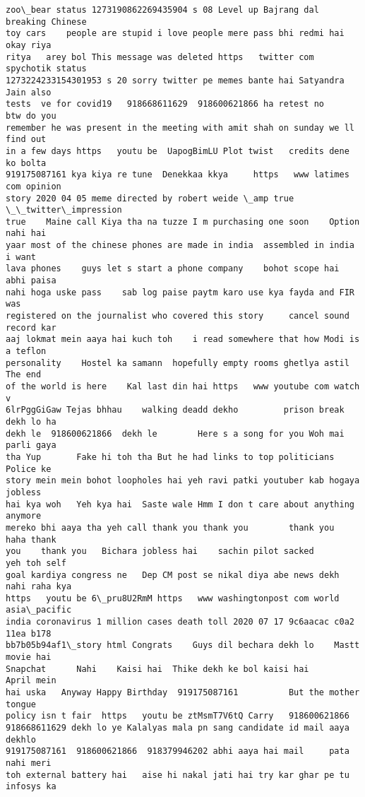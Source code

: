 \documentclass[11pt]{article}
\begin{document}
\begin{tcolorbox}[breakable, size=fbox, boxrule=.5pt, pad at break*=1mm, opacityfill=0]
\begin{Verbatim}[commandchars=\\\{\}]
zoo\_bear status 1273190862269435904 s 08 Level up Bajrang dal breaking Chinese
toy cars    people are stupid i love people mere pass bhi redmi hai okay riya
ritya   arey bol This message was deleted https   twitter com spychotik status
1273224233154301953 s 20 sorry twitter pe memes bante hai Satyandra Jain also
tests  ve for covid19   918668611629  918600621866 ha retest no       btw do you
remember he was present in the meeting with amit shah on sunday we ll find out
in a few days https   youtu be  UapogBimLU Plot twist   credits dene ko bolta
919175087161 kya kiya re tune  Denekkaa kkya     https   www latimes com opinion
story 2020 04 05 meme directed by robert weide \_amp true \_\_twitter\_impression
true    Maine call Kiya tha na tuzze I m purchasing one soon    Option nahi hai
yaar most of the chinese phones are made in india  assembled in india i want
lava phones    guys let s start a phone company    bohot scope hai abhi paisa
nahi hoga uske pass    sab log paise paytm karo use kya fayda and FIR was
registered on the journalist who covered this story     cancel sound record kar
aaj lokmat mein aaya hai kuch toh    i read somewhere that how Modi is a teflon
personality    Hostel ka samann  hopefully empty rooms ghetlya astil    The end
of the world is here    Kal last din hai https   www youtube com watch v
6lrPggGiGaw Tejas bhhau    walking deadd dekho         prison break dekh lo ha
dekh le  918600621866  dekh le        Here s a song for you Woh mai parli gaya
tha Yup       Fake hi toh tha But he had links to top politicians Police ke
story mein mein bohot loopholes hai yeh ravi patki youtuber kab hogaya   jobless
hai kya woh   Yeh kya hai  Saste wale Hmm I don t care about anything anymore
mereko bhi aaya tha yeh call thank you thank you        thank you   haha thank
you    thank you   Bichara jobless hai    sachin pilot sacked       yeh toh self
goal kardiya congress ne   Dep CM post se nikal diya abe news dekh nahi raha kya
https   youtu be 6\_pru8U2RmM https   www washingtonpost com world asia\_pacific
india coronavirus 1 million cases death toll 2020 07 17 9c6aacac c0a2 11ea b178
bb7b05b94af1\_story html Congrats    Guys dil bechara dekh lo    Mastt movie hai
Snapchat      Nahi    Kaisi hai  Thike dekh ke bol kaisi hai       April mein
hai uska   Anyway Happy Birthday  919175087161          But the mother tongue
policy isn t fair  https   youtu be ztMsmT7V6tQ Carry   918600621866
918668611629 dekh lo ye Kalalyas mala pn sang candidate id mail aaya dekhlo
919175087161  918600621866  918379946202 abhi aaya hai mail     pata nahi meri
toh external battery hai   aise hi nakal jati hai try kar ghar pe tu infosys ka

\end{Verbatim}
\end{tcolorbox}
\end{document}
